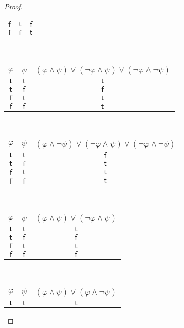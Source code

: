 \documentclass[12pt]{article}
\begin{document}
\begin{proof}
\begin{center}
\begin{tabular}{cc|c}
            $\mathsf{f}$ & $\mathsf{t}$ & $\mathsf{f}$ \\
            $\mathsf{f}$ & $\mathsf{f}$ & $\mathsf{t}$ \\
        \end{tabular}
        ~~
        \begin{tabular}{cc|c}
            $\varphi$ & $\psi$ & $(\varphi \land \psi) \lor (\neg \varphi \land \psi) \lor (\neg \varphi \land \neg \psi)$ \\ \hline
            $\mathsf{t}$ & $\mathsf{t}$ & $\mathsf{t}$ \\
            $\mathsf{t}$ & $\mathsf{f}$ & $\mathsf{f}$ \\
            $\mathsf{f}$ & $\mathsf{t}$ & $\mathsf{t}$ \\
            $\mathsf{f}$ & $\mathsf{f}$ & $\mathsf{t}$ \\
        \end{tabular}
        ~~
        \begin{tabular}{cc|c}
            $\varphi$ & $\psi$ & $(\varphi \land \neg \psi) \lor (\neg \varphi \land \psi) \lor (\neg \varphi \land \neg \psi)$ \\ \hline
            $\mathsf{t}$ & $\mathsf{t}$ & $\mathsf{f}$ \\
            $\mathsf{t}$ & $\mathsf{f}$ & $\mathsf{t}$ \\
            $\mathsf{f}$ & $\mathsf{t}$ & $\mathsf{t}$ \\
            $\mathsf{f}$ & $\mathsf{f}$ & $\mathsf{t}$ \\
        \end{tabular}
        ~~
        \begin{tabular}{cc|c}
            $\varphi$ & $\psi$ & $(\varphi \land \psi) \lor (\neg \varphi \land \psi)$ \\ \hline
            $\mathsf{t}$ & $\mathsf{t}$ & $\mathsf{t}$ \\
            $\mathsf{t}$ & $\mathsf{f}$ & $\mathsf{f}$ \\
            $\mathsf{f}$ & $\mathsf{t}$ & $\mathsf{t}$ \\
            $\mathsf{f}$ & $\mathsf{f}$ & $\mathsf{f}$ \\
        \end{tabular}
        ~~
        \begin{tabular}{cc|c}
            $\varphi$ & $\psi$ & $(\varphi \land \psi) \lor (\varphi \land \neg \psi)$ \\ \hline
            $\mathsf{t}$ & $\mathsf{t}$ & $\mathsf{t}$ \\

\end{tabular}
\end{center}
\end{proof}
\end{document}
